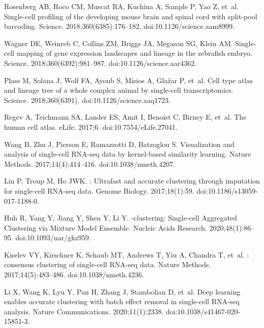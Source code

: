 \documentclass[10pt,letterpaper]{article}
\begin{document}
\begin{thebibliography}{10}
Rosenberg AB, Roco CM, Muscat RA, Kuchina A, Sample P, Yao Z, et~al.
\newblock Single-cell profiling of the developing mouse brain and spinal cord
  with split-pool barcoding.
\newblock Science. 2018;360(6385):176--182.
\newblock doi:{10.1126/science.aam8999}.

Wagner DE, Weinreb C, Collins ZM, Briggs JA, Megason SG, Klein AM.
\newblock Single-cell mapping of gene expression landscapes and lineage in the
  zebrafish embryo.
\newblock Science. 2018;360(6392):981--987.
\newblock doi:{10.1126/science.aar4362}.

Plass M, Solana J, Wolf FA, Ayoub S, Misios A, Glažar P, et~al.
\newblock Cell type atlas and lineage tree of a whole complex animal by
  single-cell transcriptomics.
\newblock Science. 2018;360(6391).
\newblock doi:{10.1126/science.aaq1723}.

Regev A, Teichmann SA, Lander ES, Amit I, Benoist C, Birney E, et~al.
\newblock The human cell atlas.
\newblock eLife. 2017;6.
\newblock doi:{10.7554/{eLife}.27041}.

Wang B, Zhu J, Pierson E, Ramazzotti D, Batzoglou S.
\newblock Visualization and analysis of single-cell {RNA}-seq data by
  kernel-based similarity learning.
\newblock Nature Methods. 2017;14(4):414--416.
\newblock doi:{10.1038/nmeth.4207}.

Lin P, Troup M, Ho JWK.
: Ultrafast and accurate clustering through imputation for
  single-cell {RNA}-seq data.
\newblock Genome Biology. 2017;18(1):59.
\newblock doi:{10.1186/s13059-017-1188-0}.

Huh R, Yang Y, Jiang Y, Shen Y, Li Y.
-clustering: Single-cell Aggregated Clustering via Mixture
  Model Ensemble.
\newblock Nucleic Acids Research. 2020;48(1):86--95.
\newblock doi:{10.1093/nar/gkz959}.

Kiselev VY, Kirschner K, Schaub MT, Andrews T, Yiu A, Chandra T, et~al.
: consensus clustering of single-cell {RNA}-seq data.
\newblock Nature Methods. 2017;14(5):483--486.
\newblock doi:{10.1038/nmeth.4236}.

Li X, Wang K, Lyu Y, Pan H, Zhang J, Stambolian D, et~al.
\newblock Deep learning enables accurate clustering with batch effect removal
  in single-cell {RNA}-seq analysis.
\newblock Nature Communications. 2020;11(1):2338.
\newblock doi:{10.1038/s41467-020-15851-3}.


\end{thebibliography}
\end{document}
